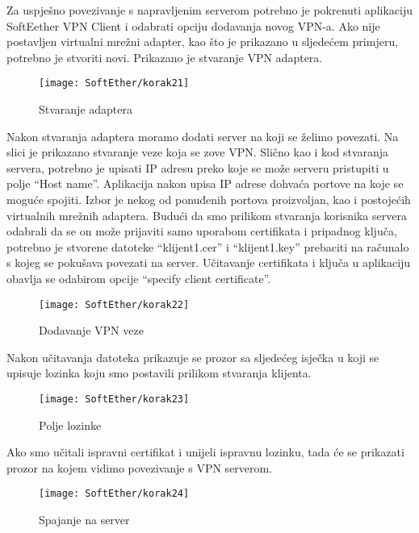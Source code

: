 \hfill \smallbreak
Za uspješno povezivanje s napravljenim serverom potrebno je pokrenuti aplikaciju SoftEether VPN Client i odabrati opciju dodavanja novog VPN-a. Ako nije postavljen virtualni mrežni adapter, kao što je prikazano u sljedećem primjeru, potrebno je stvoriti novi. Prikazano je stvaranje VPN adaptera.
\begin{figure}[h!]
     \centering
     \texttt{[image: SoftEther/korak21]}
     \caption{Stvaranje adaptera}
\end{figure}
\FloatBarrier
Nakon stvaranja adaptera moramo dodati server na koji se želimo povezati. Na slici je prikazano stvaranje veze koja se zove VPN. Slično kao i kod stvaranja servera, potrebno je upisati IP adresu preko koje se može serveru pristupiti u polje ``Host name''. Aplikacija nakon upisa IP adrese dohvaća portove na koje se moguće spojiti. Izbor je nekog od ponuđenih portova proizvoljan, kao i postojećih virtualnih mrežnih adaptera. Budući da smo prilikom stvaranja korisnika servera odabrali da se on može prijaviti samo uporabom certifikata i pripadnog ključa, potrebno je stvorene datoteke ``klijent1.cer'' i ``klijent1.key'' prebaciti na računalo s kojeg se pokušava povezati na server. Učitavanje certifikata i ključa u aplikaciju obavlja se odabirom opcije ``specify client certificate''.
\begin{figure}[h!]
     \centering
     \texttt{[image: SoftEther/korak22]}
     \caption{Dodavanje VPN veze}
\end{figure}
\FloatBarrier
Nakon učitavanja datoteka prikazuje se prozor sa sljedećeg isječka u koji se upisuje lozinka koju smo postavili prilikom stvaranja klijenta.
\begin{figure}[h!]
     \centering
     \texttt{[image: SoftEther/korak23]}
     \caption{Polje lozinke}
\end{figure}
\FloatBarrier
Ako smo učitali ispravni certifikat i unijeli ispravnu lozinku, tada će se prikazati prozor na kojem vidimo povezivanje s VPN serverom.
\begin{figure}[h!]
     \centering
     \texttt{[image: SoftEther/korak24]}
     \caption{Spajanje na server}
\end{figure}
\FloatBarrier

